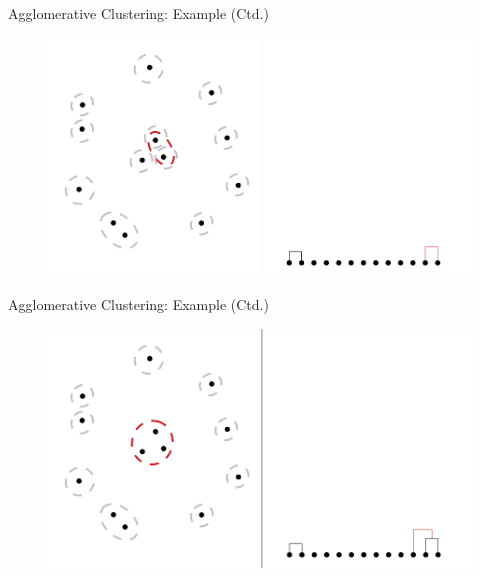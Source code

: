 \begin{frame}{Agglomerative Clustering: Example (Ctd.)}{}
	\begin{figure}
		\centering
		\includegraphics[scale=0.4]{12_clustering/02_img/aggl_clust_2}
	\end{figure}
\end{frame}


\begin{frame}{Agglomerative Clustering: Example (Ctd.)}{}
	\begin{figure}
		\centering
		\includegraphics[scale=0.4]{12_clustering/02_img/aggl_clust_3}
	\end{figure}
\end{frame}


